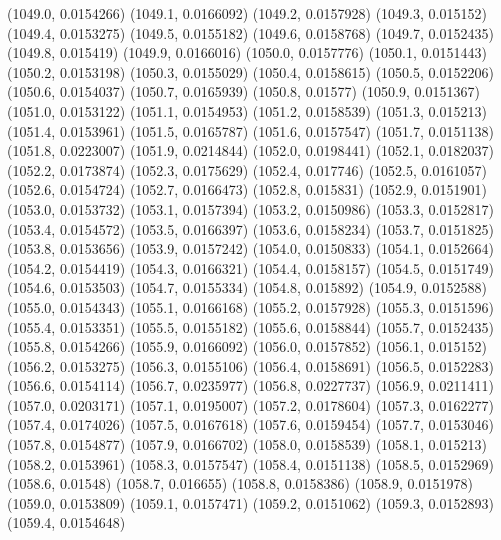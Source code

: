 {					(1049.0, 0.0154266)
					(1049.1, 0.0166092)
					(1049.2, 0.0157928)
					(1049.3, 0.015152)
					(1049.4, 0.0153275)
					(1049.5, 0.0155182)
					(1049.6, 0.0158768)
					(1049.7, 0.0152435)
					(1049.8, 0.015419)
					(1049.9, 0.0166016)
					(1050.0, 0.0157776)
					(1050.1, 0.0151443)
					(1050.2, 0.0153198)
					(1050.3, 0.0155029)
					(1050.4, 0.0158615)
					(1050.5, 0.0152206)
					(1050.6, 0.0154037)
					(1050.7, 0.0165939)
					(1050.8, 0.01577)
					(1050.9, 0.0151367)
					(1051.0, 0.0153122)
					(1051.1, 0.0154953)
					(1051.2, 0.0158539)
					(1051.3, 0.015213)
					(1051.4, 0.0153961)
					(1051.5, 0.0165787)
					(1051.6, 0.0157547)
					(1051.7, 0.0151138)
					(1051.8, 0.0223007)
					(1051.9, 0.0214844)
					(1052.0, 0.0198441)
					(1052.1, 0.0182037)
					(1052.2, 0.0173874)
					(1052.3, 0.0175629)
					(1052.4, 0.017746)
					(1052.5, 0.0161057)
					(1052.6, 0.0154724)
					(1052.7, 0.0166473)
					(1052.8, 0.015831)
					(1052.9, 0.0151901)
					(1053.0, 0.0153732)
					(1053.1, 0.0157394)
					(1053.2, 0.0150986)
					(1053.3, 0.0152817)
					(1053.4, 0.0154572)
					(1053.5, 0.0166397)
					(1053.6, 0.0158234)
					(1053.7, 0.0151825)
					(1053.8, 0.0153656)
					(1053.9, 0.0157242)
					(1054.0, 0.0150833)
					(1054.1, 0.0152664)
					(1054.2, 0.0154419)
					(1054.3, 0.0166321)
					(1054.4, 0.0158157)
					(1054.5, 0.0151749)
					(1054.6, 0.0153503)
					(1054.7, 0.0155334)
					(1054.8, 0.015892)
					(1054.9, 0.0152588)
					(1055.0, 0.0154343)
					(1055.1, 0.0166168)
					(1055.2, 0.0157928)
					(1055.3, 0.0151596)
					(1055.4, 0.0153351)
					(1055.5, 0.0155182)
					(1055.6, 0.0158844)
					(1055.7, 0.0152435)
					(1055.8, 0.0154266)
					(1055.9, 0.0166092)
					(1056.0, 0.0157852)
					(1056.1, 0.015152)
					(1056.2, 0.0153275)
					(1056.3, 0.0155106)
					(1056.4, 0.0158691)
					(1056.5, 0.0152283)
					(1056.6, 0.0154114)
					(1056.7, 0.0235977)
					(1056.8, 0.0227737)
					(1056.9, 0.0211411)
					(1057.0, 0.0203171)
					(1057.1, 0.0195007)
					(1057.2, 0.0178604)
					(1057.3, 0.0162277)
					(1057.4, 0.0174026)
					(1057.5, 0.0167618)
					(1057.6, 0.0159454)
					(1057.7, 0.0153046)
					(1057.8, 0.0154877)
					(1057.9, 0.0166702)
					(1058.0, 0.0158539)
					(1058.1, 0.015213)
					(1058.2, 0.0153961)
					(1058.3, 0.0157547)
					(1058.4, 0.0151138)
					(1058.5, 0.0152969)
					(1058.6, 0.01548)
					(1058.7, 0.016655)
					(1058.8, 0.0158386)
					(1058.9, 0.0151978)
					(1059.0, 0.0153809)
					(1059.1, 0.0157471)
					(1059.2, 0.0151062)
					(1059.3, 0.0152893)
					(1059.4, 0.0154648)
}
